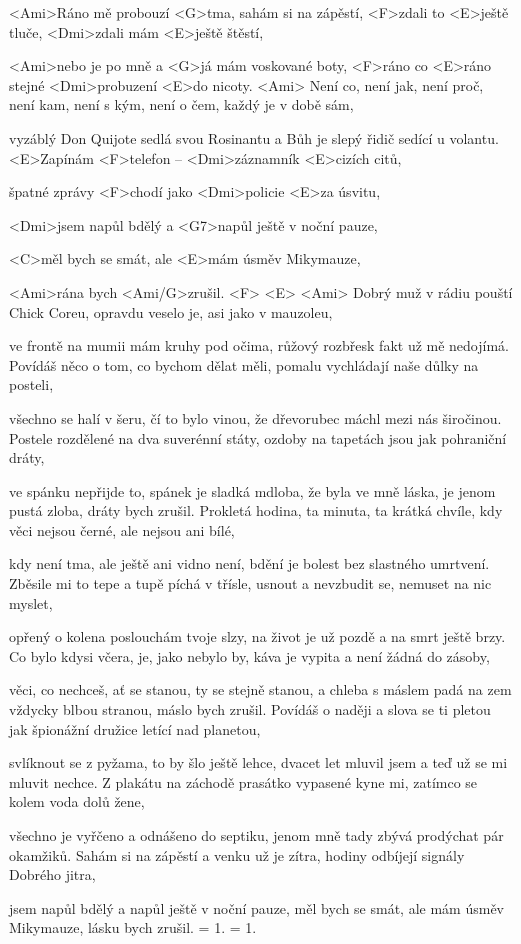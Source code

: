 
\zs
<Ami>Ráno mě probouzí <G>tma, sahám si na zápěs{tí},
<F>zdali to <E>ještě tluče, <Dmi>zdali mám <E>ještě 
štěstí,

<Ami>nebo je po mně a <G>já mám voskované bo{ty},
<F>ráno co <E>ráno stejné <Dmi>probuzení <E>do nicoty. <Ami>
\ks
\zs
Není co, není jak, není proč, není kam,
není s kým, není o čem, každý je v době sám,

vyzáblý Don Quijote sedlá svou Rosinantu
a Bůh je slepý řidič sedící u volantu.
\ks
\zr
<E>Zapínám <F>telefon -- <Dmi>záznamník <E>cizích citů,

špatné zprávy <F>chodí jako <Dmi>policie <E>za úsvitu,

<Dmi>jsem napůl bdělý a <G7>napůl ještě v noční pauze,

<C>měl bych se smát, ale <E>mám úsměv Mikymauze,

<Ami>rána bych <Ami/G>zrušil. <F> <E> <Ami>
\kr
\zs
Dobrý muž v rádiu pouští Chick Coreu,
opravdu veselo je, asi jako v mauzoleu,

ve frontě na mumii mám kruhy pod očima,
růžový rozbřesk fakt už mě nedojímá.
\ks
\zs
Povídáš něco o tom, co bychom dělat měli,
pomalu vychládají naše důlky na posteli,

všechno se halí v šeru, čí to bylo vinou,
že dřevorubec máchl mezi nás širočinou.
\ks
\zr
Postele rozdělené na dva suverénní státy,
ozdoby na tapetách jsou jak pohraniční dráty,

ve spánku nepřijde to, spánek je sladká mdloba,
že byla ve mně láska, je jenom pustá zloba,
dráty bych zrušil.
\kr
\zs
Prokletá hodina, ta minuta, ta krátká chvíle,
kdy věci nejsou černé, ale nejsou ani bílé,

kdy není tma, ale ještě ani vidno není,
bdění je bolest bez slastného umrtvení.
\ks
\zs
Zběsile mi to tepe a tupě píchá v třísle,
usnout a nevzbudit se, nemuset na nic myslet,

opřený o kolena poslouchám tvoje slzy,
na život je už pozdě a na smrt ještě brzy.
\ks
\zr
Co bylo kdysi včera, je, jako nebylo by,
káva je vypita a není žádná do zásoby,

věci, co nechceš, ať se stanou, ty se stejně stanou,
a chleba s máslem padá na zem vždycky blbou stranou,
máslo bych zrušil.
\kr
\zs
Povídáš o naději a slova se ti pletou
jak špionážní družice letící nad planetou,

svlíknout se z pyžama, to by šlo ještě lehce,
dvacet let mluvil jsem a teď už se mi mluvit nechce.
\ks
\zs
Z plakátu na záchodě prasátko vypasené
kyne mi, zatímco se kolem voda dolů žene,

všechno je vyřčeno a odnášeno do septiku,
jenom mně tady zbývá prodýchat pár okamžiků.
\ks
\zr
Sahám si na zápěstí a venku už je zítra,
hodiny odbíjejí signály Dobrého jitra,

jsem napůl bdělý a napůl ještě v noční pauze,
měl bych se smát, ale mám úsměv Mikymauze,
lásku bych zrušil.
\kr
\zs
= 1.
\ks
\zs
= 1.
\ks
\kp






